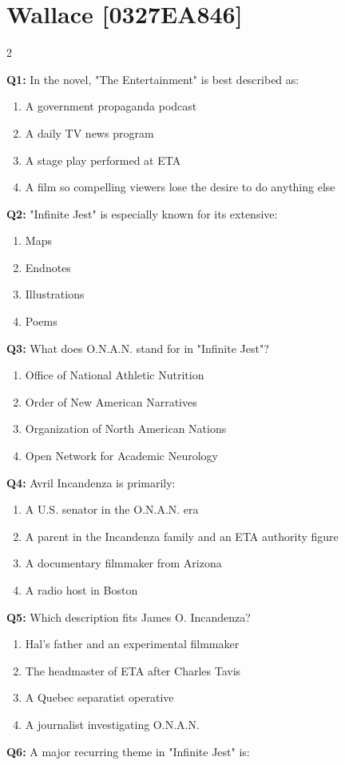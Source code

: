 \documentclass[10pt]{article}
\begin{document}
\section*{Wallace \footnotesize [0327EA846]}
\begin{multicols}{2}

\textbf{Q1:} In the novel, "The Entertainment" is best described as:

\begin{enumerate}[label=\arabic*.]
\item A government propaganda podcast
\item A daily TV news program
\item A stage play performed at ETA
\item A film so compelling viewers lose the desire to do anything else
\end{enumerate}
\textbf{Q2:} "Infinite Jest" is especially known for its extensive:

\begin{enumerate}[label=\arabic*.]
\item Maps
\item Endnotes
\item Illustrations
\item Poems
\end{enumerate}
\textbf{Q3:} What does O.N.A.N. stand for in "Infinite Jest"?

\begin{enumerate}[label=\arabic*.]
\item Office of National Athletic Nutrition
\item Order of New American Narratives
\item Organization of North American Nations
\item Open Network for Academic Neurology
\end{enumerate}
\textbf{Q4:} Avril Incandenza is primarily:

\begin{enumerate}[label=\arabic*.]
\item A U.S. senator in the O.N.A.N. era
\item A parent in the Incandenza family and an ETA authority figure
\item A documentary filmmaker from Arizona
\item A radio host in Boston
\end{enumerate}
\textbf{Q5:} Which description fits James O. Incandenza?

\begin{enumerate}[label=\arabic*.]
\item Hal's father and an experimental filmmaker
\item The headmaster of ETA after Charles Tavis
\item A Quebec separatist operative
\item A journalist investigating O.N.A.N.
\end{enumerate}
\textbf{Q6:} A major recurring theme in "Infinite Jest" is:


\end{multicols}
\end{document}
